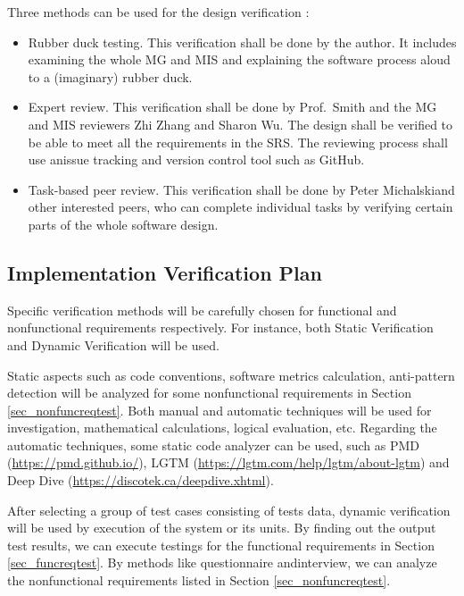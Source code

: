 \documentclass[12pt, titlepage]{article}
\begin{document}

Three methods can be used for the design verification
\cite{Soraine2019SystVnv}:\begin{itemize}
\item Rubber duck testing. This verification shall be done by the author. It
includes examining the whole MG and MIS and explaining the software process
aloud to a (imaginary) rubber duck.

\item Expert review. This verification shall be done by Prof.\ Smith and the MG
and MIS reviewers Zhi Zhang and Sharon Wu. The design shall be verified to be
able to meet all the requirements in the SRS. The reviewing process shall use
anissue tracking and version control tool such as GitHub.

\item Task-based peer review. This verification shall be done by Peter
Michalskiand other interested peers, who can complete individual tasks by
verifying
certain parts of the whole software design.
\end{itemize}

\subsection{Implementation Verification Plan}

Specific verification methods will be carefully chosen for functional and
nonfunctional requirements respectively. For instance, both Static Verification
and Dynamic Verification will be used.
    
    Static aspects such as code conventions, software metrics calculation,
anti-pattern detection will be analyzed for some nonfunctional requirements in
Section \ref{sec_nonfuncreqtest}. Both manual and automatic techniques will be
used for investigation, mathematical calculations, logical evaluation,
etc. Regarding the automatic techniques, some static code analyzer can be used,
such as PMD (\url{https://pmd.github.io/}), 
LGTM (\url{https://lgtm.com/help/lgtm/about-lgtm}) and Deep Dive
(\url{https://discotek.ca/deepdive.xhtml}).
    
    After selecting a group of test cases consisting of tests data, dynamic
verification will be used by execution of the system or its units. By finding
out the output test results, we can execute testings for the functional
requirements in Section \ref{sec_funcreqtest}. By methods like questionnaire
andinterview, we can analyze the nonfunctional requirements listed in Section
\ref{sec_nonfuncreqtest}.
\end{document}

